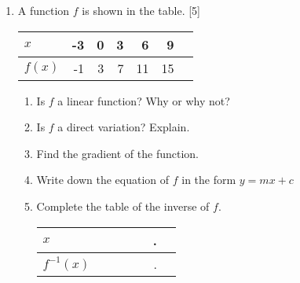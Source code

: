 \documentclass[12pt, twoside]{article}
\begin{document}
\begin{enumerate}
\newpage
\item A function $f$ is shown in the table. \hfill [5]
  \begin{center}
    \begin{tabular}{|l|r|r|r|r|r|r|}
      \hline
      $x$ & -3 & 0 & 3 & 6 & 9\\ 
      \hline 
      $f(x)$ & -1 & 3 & 7 & 11 & 15\\ 
      \hline 
    \end{tabular}
  \end{center}
  \begin{enumerate}[itemsep=2.5cm]
    \item Is $f$ a linear function? Why or why not?
    \item Is $f$ a direct variation? Explain.
    \item Find the gradient of the function. \vspace{1cm}
    \item Write down the equation of $f$ in the form $y=mx+c$
    \item Complete the table of the inverse of $f$.
      \begin{center}
        \begin{tabular}{|l|r|r|r|r|r|r|}
          \hline
          $x$ & \hspace{1cm} & \hspace{1cm} & \hspace{1cm} & \hspace{1cm} & \hspace{1cm}.\\[1cm] 
          \hline 
          $f^{-1}(x)$ & \hspace{1cm} & \hspace{1cm} & \hspace{1cm} & \hspace{1cm} & \hspace{1cm}.\\[1cm] 
          \hline 
        \end{tabular}
      \end{center}
  \end{enumerate}

\newpage


\end{enumerate}
\end{document}
